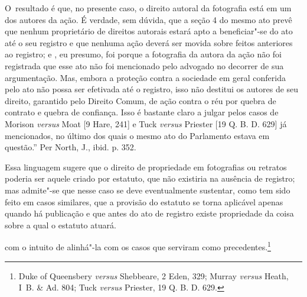 {  O~resultado é que, no presente caso, o direito autoral da fotografia
  está em um dos autores da ação. É verdade, sem dúvida, que a seção 4
  do mesmo ato prevê que nenhum proprietário de direitos autorais estará
  apto a beneficiar"-se do ato até o seu registro e que nenhuma ação
  deverá ser movida sobre feitos anteriores ao registro; e , eu presumo,
  foi porque a fotografia da autora da ação não foi registrada que esse
  ato não foi mencionado pelo advogado no decorrer de sua argumentação.
  Mas, embora a proteção contra a sociedade em geral conferida pelo ato
  não possa ser efetivada até o registro, isso não destitui os autores
  de seu direito, garantido pelo Direito Comum, de ação contra o réu por
  quebra de contrato e quebra de confiança. Isso é bastante claro a
  julgar pelos casos de Morison \emph{versus} Moat {[}9 Hare, 241{]} e
  Tuck \emph{versus} Priester {[}19 Q. B. D. 629{]} já mencionados, no
  último dos quais o mesmo ato do Parlamento estava em questão.'' Per
  North, J., ibid. p. 352.

  Essa linguagem sugere que o direito de propriedade em fotografias ou
  retratos poderia ser aquele criado por estatuto, que não existiria na
  ausência de registro; mas admite"-se que nesse caso se deve
  eventualmente sustentar, como tem sido feito em casos similares, que a
  provisão do estatuto se torna aplicável apenas quando há publicação e
  que antes do ato de registro existe propriedade da coisa sobre a qual
  o estatuto atuará.} com o intuito de alinhá"-la com os casos que
serviram como precedentes.\footnote{Duke of Queensbery \emph{versus}
  Shebbeare, 2 Eden, 329; Murray \emph{versus} Heath, I~B. \& Ad. 804;
  Tuck \emph{versus} Priester, 19 Q. B. D. 629.}


